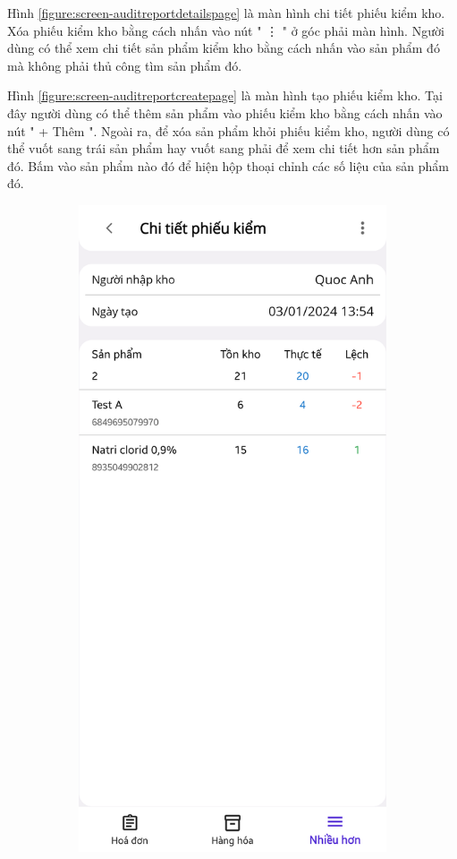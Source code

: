 \documentclass[../DoAn.tex]{subfiles}
\begin{document}
Hình \ref{figure:screen-auditreportdetailspage} là màn hình chi tiết phiếu kiểm kho. Xóa phiếu kiểm kho bằng cách nhấn vào nút " \vdots{} " ở góc phải màn hình. Người dùng có thể xem chi tiết sản phẩm kiểm kho bằng cách nhấn vào sản phẩm đó mà không phải thủ công tìm sản phẩm đó.

Hình \ref{figure:screen-auditreportcreatepage} là màn hình tạo phiếu kiểm kho. Tại đây người dùng có thể thêm sản phẩm vào phiếu kiểm kho bằng cách nhấn vào nút " + Thêm ". Ngoài ra, để xóa sản phẩm khỏi phiếu kiểm kho, người dùng có thể vuốt sang trái sản phẩm hay vuốt sang phải để xem chi tiết hơn sản phẩm đó. Bấm vào sản phẩm nào đó để hiện hộp thoại chỉnh các số liệu của sản phẩm đó.
\begin{figure}[H]
    \begin{subfigure}{0.49\linewidth}
        \centering
        \includegraphics[width=0.9\linewidth]{Hinhve/design/screens/AuditReportDetailsPage}

\end{subfigure}
\end{figure}
\end{document}
